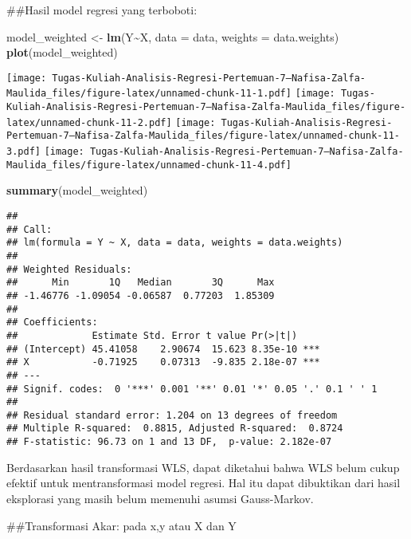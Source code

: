 \documentclass[
]{article}
\newenvironment{Shaded}{\begin{snugshade}}{\end{snugshade}}
\newcommand{\AttributeTok}[1]{\textcolor[rgb]{0.13,0.29,0.53}{#1}}
\newcommand{\FunctionTok}[1]{\textcolor[rgb]{0.13,0.29,0.53}{\textbf{#1}}}
\newcommand{\NormalTok}[1]{#1}
\newcommand{\OtherTok}[1]{\textcolor[rgb]{0.56,0.35,0.01}{#1}}
\newcommand{\SpecialCharTok}[1]{\textcolor[rgb]{0.81,0.36,0.00}{\textbf{#1}}}
\begin{document}
\#\#Hasil model regresi yang terboboti:

\begin{Shaded}
\begin{Highlighting}[]
\NormalTok{model\_weighted }\OtherTok{\textless{}{-}} \FunctionTok{lm}\NormalTok{(Y}\SpecialCharTok{\textasciitilde{}}\NormalTok{X, }\AttributeTok{data =}\NormalTok{ data, }\AttributeTok{weights =}\NormalTok{ data.weights)}
\FunctionTok{plot}\NormalTok{(model\_weighted)}
\end{Highlighting}
\end{Shaded}

\texttt{[image: Tugas-Kuliah-Analisis-Regresi-Pertemuan-7---Nafisa-Zalfa-Maulida\_files/figure-latex/unnamed-chunk-11-1.pdf]}
\texttt{[image: Tugas-Kuliah-Analisis-Regresi-Pertemuan-7---Nafisa-Zalfa-Maulida\_files/figure-latex/unnamed-chunk-11-2.pdf]}
\texttt{[image: Tugas-Kuliah-Analisis-Regresi-Pertemuan-7---Nafisa-Zalfa-Maulida\_files/figure-latex/unnamed-chunk-11-3.pdf]}
\texttt{[image: Tugas-Kuliah-Analisis-Regresi-Pertemuan-7---Nafisa-Zalfa-Maulida\_files/figure-latex/unnamed-chunk-11-4.pdf]}

\begin{Shaded}
\begin{Highlighting}[]
\FunctionTok{summary}\NormalTok{(model\_weighted)}
\end{Highlighting}
\end{Shaded}

\begin{verbatim}
## 
## Call:
## lm(formula = Y ~ X, data = data, weights = data.weights)
## 
## Weighted Residuals:
##      Min       1Q   Median       3Q      Max 
## -1.46776 -1.09054 -0.06587  0.77203  1.85309 
## 
## Coefficients:
##             Estimate Std. Error t value Pr(>|t|)    
## (Intercept) 45.41058    2.90674  15.623 8.35e-10 ***
## X           -0.71925    0.07313  -9.835 2.18e-07 ***
## ---
## Signif. codes:  0 '***' 0.001 '**' 0.01 '*' 0.05 '.' 0.1 ' ' 1
## 
## Residual standard error: 1.204 on 13 degrees of freedom
## Multiple R-squared:  0.8815, Adjusted R-squared:  0.8724 
## F-statistic: 96.73 on 1 and 13 DF,  p-value: 2.182e-07
\end{verbatim}

Berdasarkan hasil transformasi WLS, dapat diketahui bahwa WLS belum
cukup efektif untuk mentransformasi model regresi. Hal itu dapat
dibuktikan dari hasil eksplorasi yang masih belum memenuhi asumsi
Gauss-Markov.

\#\#Transformasi Akar: pada x,y atau X dan Y
\end{document}

